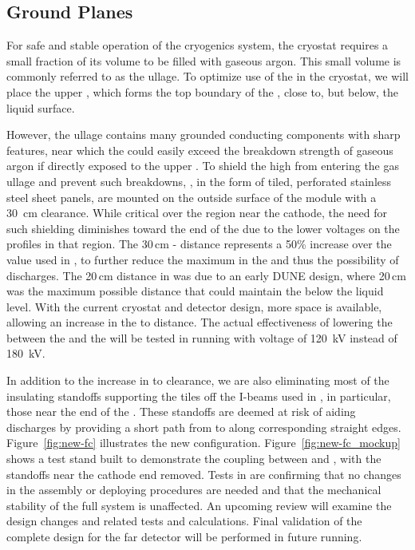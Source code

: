\subsection{Ground Planes}
\label{sec:fdsp-hv-des-fc-gp}

For safe and stable operation of the \lar cryogenics system, the cryostat requires a small fraction of its volume to be filled with gaseous argon. This small volume is commonly referred to as the ullage. To optimize use of the \lar in the cryostat, we will place the upper , which forms the top boundary of the , close to, but below, the liquid surface.

However, the ullage contains many grounded %
conducting components with sharp features, near which the \efield could easily exceed the breakdown strength of gaseous argon if directly exposed to the upper . %
To shield the high \efield from entering the gas ullage and prevent such breakdowns, %
, %
in the form of tiled, perforated stainless steel sheet panels, are mounted on the outside surface of the 
 module with a \SI{30}{cm} clearance. While critical over the region near the cathode, the need for such shielding diminishes toward the  end of the  due to the lower voltages on the  profiles in that region. 
The 30\,cm - distance represents a 50\% increase over the value used in , to further reduce the maximum \efield in the  and thus the possibility of discharges. The 20\,cm distance in  was due to an early DUNE design, where 20\,cm was the maximum possible distance that could maintain the  below the liquid level. With the current cryostat and detector design, more space is available, allowing an increase in the  to  distance. The actual effectiveness of lowering the \efield between the  and the  will be tested in  running with  voltage of \SI{120}{\kV} instead of \SI{180}{\kV}.
 
In addition to the increase in  to  clearance, we are also eliminating most of the insulating standoffs supporting the  tiles off the  I-beams used in , in particular, those near the  end of the .  These standoffs  are deemed at risk of aiding discharges by providing a short path from  to  along corresponding straight edges.  Figure~\ref{fig:new-fc} illustrates the new configuration. Figure~\ref{fig:new-fc_mockup} shows a test stand built to demonstrate the coupling between  and , with the standoffs near the cathode end removed. Tests in  are confirming that no changes in the assembly or deploying procedures are needed and that the mechanical stability of the full system is unaffected. An upcoming review will examine the design changes and related tests and calculations. Final validation of the complete  design for the far detector will be performed in future  running.

